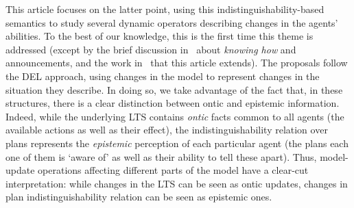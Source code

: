 %
%
%



This article focuses on the latter point, using this in\-dis\-tin\-guisha\-bil\-i\-ty-based semantics to study several dynamic operators describing changes in the agents' abilities. To the best of our knowledge, this is the first time this theme is addressed (except by the brief discussion in~\cite{Wang2016} about \emph{knowing how} and announcements, and the work in~\cite{AFSV22} that this article extends). The proposals follow the DEL approach, using changes in the model to represent changes in the situation they describe. In doing so, we take advantage of the fact that, in these structures, there is a clear distinction between ontic and epistemic information. Indeed, while the underlying LTS contains \emph{ontic} facts common to all agents (the available actions as well as their effect), the indistinguishability relation over plans represents the \emph{epistemic} perception of each particular agent (the plans each one of them is `aware of' as well as their ability to tell these apart). Thus, model-update operations affecting different parts of the model have a clear-cut interpretation: while changes in the LTS can be seen as ontic updates, changes in plan indistinguishability relation can be seen as epistemic ones. 


